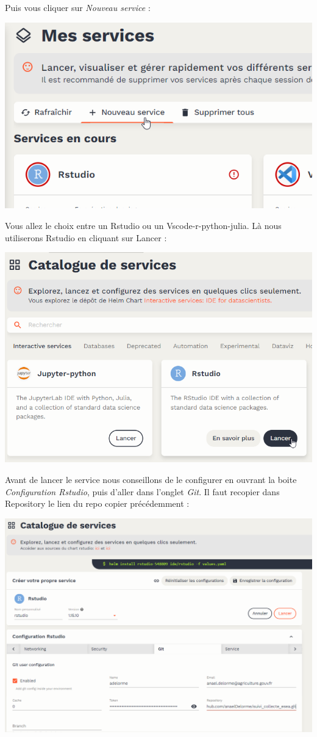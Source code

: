 \documentclass[
  letterpaper,
  DIV=11,
  numbers=noendperiod]{scrreprt}
\begin{document}
Puis vous cliquer sur \emph{Nouveau service} :

\includegraphics{./images/datalab_nouveau_service.png}

Vous allez le choix entre un Rstudio ou un Vscode-r-python-julia. Là
nous utiliserons Rstudio en cliquant sur Lancer :

\includegraphics{./images/datalab_Rstudio_service.png}

Avant de lancer le service nous conseillons de le configurer en ouvrant
la boite \emph{Configuration Rstudio}, puis d'aller dans l'onglet
\emph{Git}. Il faut recopier dans Repository le lien du repo copier
précédemment :

\includegraphics{./images/datalab_Rstudio_service_repo.png}
\end{document}
